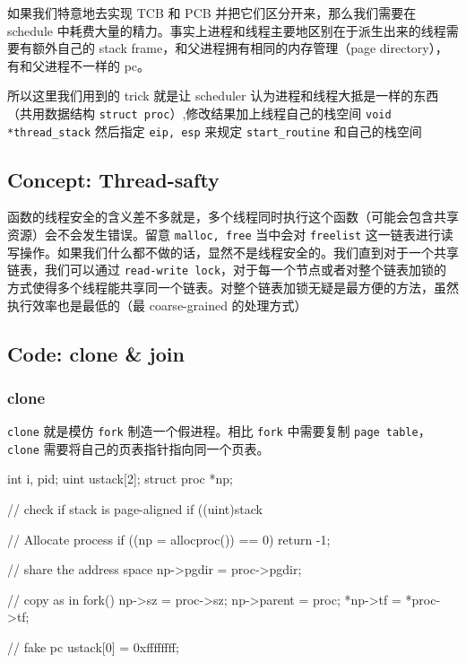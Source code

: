如果我们特意地去实现 TCB 和 PCB 并把它们区分开来，那么我们需要在 schedule 中耗费大量的精力。事实上进程和线程主要地区别在于派生出来的线程需要有额外自己的 stack frame，和父进程拥有相同的内存管理（page directory），有和父进程不一样的 pc。

所以这里我们用到的 trick 就是让 scheduler 认为进程和线程大抵是一样的东西（共用数据结构 \texttt{struct proc}）,修改结果加上线程自己的栈空间 \texttt{void *thread\_stack} 然后指定 \texttt{eip, esp} 来规定 \texttt{start\_routine} 和自己的栈空间

\subsection{Concept: Thread-safty}

函数的线程安全的含义差不多就是，多个线程同时执行这个函数（可能会包含共享资源）会不会发生错误。留意 \texttt{malloc, free} 当中会对 \texttt{freelist} 这一链表进行读写操作。如果我们什么都不做的话，显然不是线程安全的。我们直到对于一个共享链表，我们可以通过 \texttt{read-write lock}，对于每一个节点或者对整个链表加锁的方式使得多个线程能共享同一个链表。对整个链表加锁无疑是最方便的方法，虽然执行效率也是最低的（最 coarse-grained 的处理方式）


\subsection{Code: clone \& join}





\subsubsection{clone}

\texttt{clone} 就是模仿 \texttt{fork} 制造一个假进程。相比 \texttt{fork} 中需要复制 \texttt{page table}，\texttt{clone} 需要将自己的页表指针指向同一个页表。

\begin{ccode}
	int i, pid;
	uint ustack[2];
	struct proc *np;
			
	// check if stack is page-aligned
	if ((uint)stack %
			
	// Allocate process
	if ((np = allocproc()) == 0)
	return -1;
			
	// share the address space
	np->pgdir = proc->pgdir;
			
	// copy as in fork()
	np->sz = proc->sz;
	np->parent = proc;
	*np->tf = *proc->tf;
			
	// fake pc
	ustack[0] = 0xffffffff;
			
\end{ccode}

